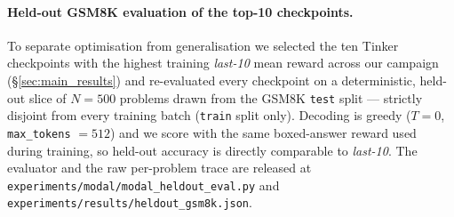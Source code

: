 \documentclass{article}
\begin{document}
\paragraph{Held-out GSM8K evaluation of the top-10 checkpoints.}
To separate optimisation from generalisation we selected the ten Tinker
checkpoints with the highest training \emph{last-10} mean reward across our
campaign (\S\ref{sec:main_results}) and re-evaluated every checkpoint on a
deterministic, held-out slice of $N=500$ problems drawn from the GSM8K
\texttt{test} split --- strictly disjoint from every training batch
(\texttt{train} split only). Decoding is greedy ($T{=}0$, \texttt{max\_tokens}
$=512$) and we score with the same boxed-answer reward used during training,
so held-out accuracy is directly comparable to \emph{last-10}.
The evaluator and the raw per-problem trace are released at
\texttt{experiments/modal/modal\_heldout\_eval.py} and
\texttt{experiments/results/heldout\_gsm8k.json}.
\end{document}
